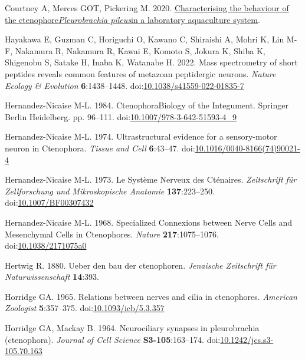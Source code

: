 \documentclass[
  11pt,
]{article}
\newlength{\cslhangindent}
\newenvironment{CSLReferences}[2] %
 {\begin{list}{}{%
  \setlength{\itemindent}{0pt}
  \setlength{\leftmargin}{0pt}
  \setlength{\parsep}{0pt}
  \ifodd #1
   \setlength{\leftmargin}{\cslhangindent}
   \setlength{\itemindent}{-1\cslhangindent}
  \fi
  \setlength{\itemsep}{#2\baselineskip}}}
 {\end{list}}
\begin{document}
\begin{CSLReferences}{1}{0}
Courtney A, Merces GOT, Pickering M. 2020.
\href{http://dx.doi.org/10.1101/2020.05.25.114744}{Characterising the
behaviour of the ctenophore{\emph{Pleurobrachia pileus}}in a laboratory
aquaculture system}.

Hayakawa E, Guzman C, Horiguchi O, Kawano C, Shiraishi A, Mohri K, Lin
M-F, Nakamura R, Nakamura R, Kawai E, Komoto S, Jokura K, Shiba K,
Shigenobu S, Satake H, Inaba K, Watanabe H. 2022. Mass spectrometry of
short peptides reveals common features of metazoan peptidergic neurons.
\emph{Nature Ecology \& Evolution} \textbf{6}:1438--1448.
doi:\href{https://doi.org/10.1038/s41559-022-01835-7}{10.1038/s41559-022-01835-7}

Hernandez-Nicaise M-L. 1984. CtenophoraBiology of the Integument.
Springer Berlin Heidelberg. pp. 96--111.
doi:\href{https://doi.org/10.1007/978-3-642-51593-4_9}{10.1007/978-3-642-51593-4\_9}

Hernandez-Nicaise M-L. 1974. Ultrastructural evidence for a
sensory-motor neuron in Ctenophora. \emph{Tissue and Cell}
\textbf{6}:43--47.
doi:\href{https://doi.org/10.1016/0040-8166(74)90021-4}{10.1016/0040-8166(74)90021-4}

Hernandez-Nicaise M-L. 1973. Le Système Nerveux des Cténaires.
\emph{Zeitschrift für Zellforschung und Mikroskopische Anatomie}
\textbf{137}:223--250.
doi:\href{https://doi.org/10.1007/BF00307432}{10.1007/BF00307432}

Hernandez-Nicaise M-L. 1968. Specialized Connexions between Nerve Cells
and Mesenchymal Cells in Ctenophores. \emph{Nature}
\textbf{217}:1075--1076.
doi:\href{https://doi.org/10.1038/2171075a0}{10.1038/2171075a0}

Hertwig R. 1880. Ueber den bau der ctenophoren. \emph{Jenaische
Zeitschrift f{ü}r Naturwissenschaft} \textbf{14}:393.

Horridge GA. 1965. Relations between nerves and cilia in ctenophores.
\emph{American Zoologist} \textbf{5}:357--375.
doi:\href{https://doi.org/10.1093/icb/5.3.357}{10.1093/icb/5.3.357}

Horridge GA, Mackay B. 1964. Neurociliary synapses in pleurobrachia
(ctenophora). \emph{Journal of Cell Science} \textbf{S3-105}:163--174.
doi:\href{https://doi.org/10.1242/jcs.s3-105.70.163}{10.1242/jcs.s3-105.70.163}


\end{CSLReferences}
\end{document}
